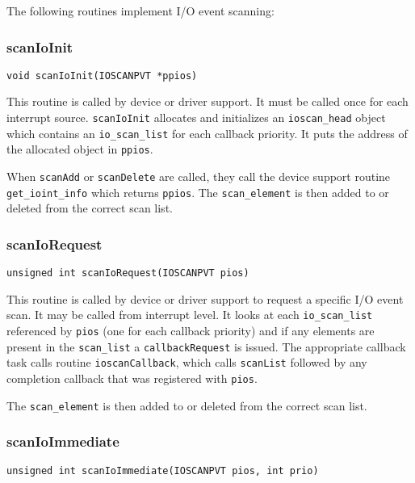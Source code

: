 The following routines implement I/O event scanning:

\subsubsection{scanIoInit}

\begin{verbatim}
void scanIoInit(IOSCANPVT *ppios)
\end{verbatim}

This routine is called by device or driver support.
It must be called once for each interrupt source.
\verb|scanIoInit| allocates and initializes an \verb|ioscan_head| object which contains an \verb|io_scan_list| for each callback priority.
It puts the address of the allocated object in \verb|ppios|.

When \verb|scanAdd| or \verb|scanDelete| are called, they call the device support routine \verb|get_ioint_info| which returns \verb|ppios|.
The \verb|scan_element| is then added to or deleted from the correct scan list.

\subsubsection{scanIoRequest}

\begin{verbatim}
unsigned int scanIoRequest(IOSCANPVT pios)
\end{verbatim}

This routine is called by device or driver support to request a specific I/O event scan.
It may be called from interrupt level.
It looks at each \verb|io_scan_list| referenced by \verb|pios| (one for each callback priority) and if any elements are present in the \verb|scan_list| a \verb|callbackRequest| is issued.
The appropriate callback task calls routine \verb|ioscanCallback|, which calls \verb|scanList| followed by any completion callback that was registered with \verb|pios|.

The \verb|scan_element| is then added to or deleted from the correct scan list.

\subsubsection{scanIoImmediate}

\begin{verbatim}
unsigned int scanIoImmediate(IOSCANPVT pios, int prio)
\end{verbatim}

